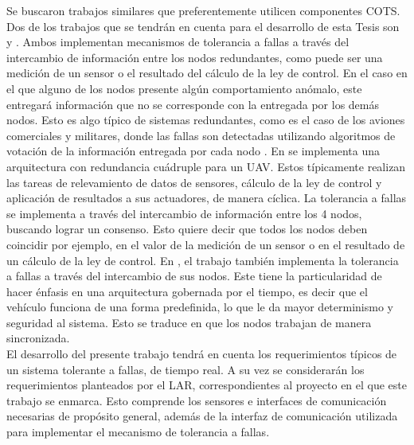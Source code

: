 Se buscaron trabajos similares que preferentemente utilicen componentes COTS. Dos de los trabajos que se tendrán en cuenta para el desarrollo de esta Tesis son \cite{hiergeist2018implementation} y \cite{zhang2020architecture}. Ambos implementan mecanismos de tolerancia a fallas a través del intercambio de información entre los nodos redundantes, como puede ser una medición de un sensor o el resultado del cálculo de la ley de control. En el caso en el que alguno de los nodos presente algún comportamiento anómalo, este entregará información que no se corresponde con la entregada por los demás nodos. Esto es algo típico de sistemas redundantes, como es el caso de los aviones comerciales y militares, donde las fallas son detectadas utilizando algoritmos de votación de la información entregada por cada nodo \cite[p.~217]{collinson2023introduction}. En \cite{hiergeist2018implementation} se implementa una arquitectura con redundancia cuádruple para un UAV. Estos típicamente realizan las tareas de relevamiento de datos de sensores, cálculo de la ley de control y aplicación de resultados a sus actuadores, de manera cíclica. La tolerancia a fallas se implementa a través del intercambio de información entre los 4 nodos, buscando lograr un consenso. Esto quiere decir que todos los nodos deben coincidir por ejemplo, en el valor de la medición de un sensor o en el resultado de un cálculo de la ley de control. En \cite{zhang2020architecture}, el trabajo también implementa la tolerancia a fallas a través del intercambio de sus nodos. Este tiene la particularidad de hacer énfasis en una arquitectura gobernada por el tiempo, es decir que el vehículo funciona de una forma predefinida, lo que le da mayor determinismo y seguridad al sistema. Esto se traduce en que los nodos trabajan de manera sincronizada.\\

El desarrollo del presente trabajo tendrá en cuenta los requerimientos típicos de un sistema tolerante a fallas, de tiempo real. A su vez se considerarán los requerimientos planteados por el LAR, correspondientes al proyecto en el que este trabajo se enmarca. Esto comprende los sensores e interfaces de comunicación necesarias de propósito general, además de la interfaz de comunicación utilizada para implementar el mecanismo de tolerancia a fallas.